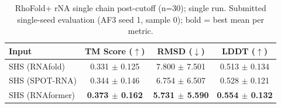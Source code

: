 \begin{table}[htbp]
\centering
\caption{RhoFold+ rNA single chain post-cutoff (n=30); single run. Submitted single-seed evaluation (AF3 seed 1, sample 0); bold = best mean per metric.}
\label{tab:rf_rna_single_chain_post_cutoff}
\begin{tabular}{lccc}
\toprule
Input & TM Score ($\uparrow$) & RMSD ($\downarrow$) & LDDT ($\uparrow$) \\
\midrule
SHS (RNAfold) & 0.331 $\pm$ 0.125 & 7.800 $\pm$ 7.501 & 0.513 $\pm$ 0.134 \\
SHS (SPOT-RNA) & 0.344 $\pm$ 0.146 & 6.754 $\pm$ 6.507 & 0.528 $\pm$ 0.121 \\
SHS (RNAformer) & \textbf{0.373 $\pm$ 0.162} & \textbf{5.731 $\pm$ 5.590} & \textbf{0.554 $\pm$ 0.132} \\
\bottomrule
\end{tabular}
\end{table}
